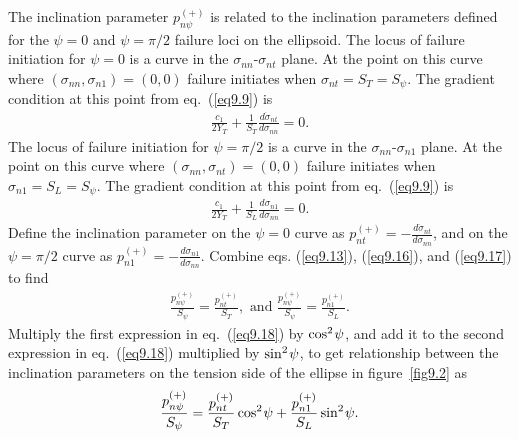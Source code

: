 \documentclass{AeroStructure-ERJohnson}
\begin{document}
The inclination parameter $p_{n \psi}^{(+)}$ is related to the inclination parameters defined for the $\psi= 0$ and $\psi=\pi/2$ failure loci on the ellipsoid. The locus of failure initiation for $\psi=0$ is a curve in the $\sigma_\textit{nn}$-$\sigma_\textit{nt}$ plane. At the point on this curve where $\left(\sigma_{n n}, \sigma_{n 1}\right)=(0,0)$ failure initiates when $\sigma_{n t}=S_{T}=S_{\psi}$. The gradient condition at this point from eq.~(\ref{eq9.9}) is
\begin{align}\label{eq9.16}
\frac{c_{1}}{2 Y_{T}}+\frac{1}{S_{T}} \frac{d \dot{\sigma}_{n t}}{d \sigma_{n n}}=0.
\end{align}
The locus of failure initiation for $\psi=\pi/2$ is a curve in the $\sigma_\textit{nn}$-$\sigma_{n1}$ plane. At the point on this curve where $\left(\sigma_{n n}, \sigma_{n t}\right)=(0,0)$ failure initiates when $\sigma_{n 1}=S_{L}=S_{\psi}$. The gradient condition at this point from eq.~(\ref{eq9.9}) is
\begin{align}\label{eq9.17}
\frac{c_{1}}{2 Y_{T}}+\frac{1}{S_{L}} \frac{d \sigma_{n 1}}{d \sigma_{n n}}=0.
\end{align}
Define the inclination parameter on the $\psi=0$ curve as $p_{n t}^{(+)}=-\frac{d \dot{\sigma}_{n t}}{d \sigma_{n n}}$, and on the $\psi=\pi/2$ curve as $p_{n 1}^{(+)}=-\frac{d \sigma_{n 1}}{d \sigma_{n n}}$. Combine eqs. (\ref{eq9.13}), (\ref{eq9.16}), and (\ref{eq9.17}) to find
\begin{align}\label{eq9.18}
\frac{p_{n \psi}^{(+)}}{S_{\psi}}=\frac{p_{n t}^{(+)}}{S_{T}}, \textrm{ and } \frac{p_{n \psi}^{(+)}}{S_{\psi}}=\frac{p_{n 1}^{(+)}}{S_{L}}.
\end{align}
Multiply the first expression in eq.~(\ref{eq9.18}) by $\cos ^{2}{\kern-1pt\psi}$, and add it to the second expression in eq.~(\ref{eq9.18}) multiplied by $\sin ^{2}{\kern-1pt\psi}$, to get relationship between the inclination parameters on the tension side of the ellipse in figure~\ref{fig9.2} as
\begin{align}\label{eq9.19}
\frac{p_{n \psi}^{(+)}}{S_{\psi}}=\frac{p_{n t}^{(+)}}{S_{T}} \cos ^{2}{\kern-1pt\psi}+\frac{p_{n 1}^{(+)}}{S_{L}} \sin ^{2}{\kern-1pt\psi}.
\end{align}
\end{document}
